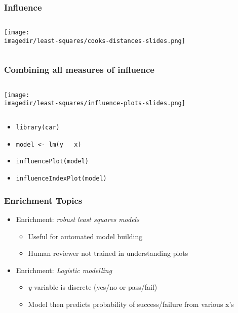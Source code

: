 \begin{frame}\frametitle{Influence}
	\begin{columns}[t]
			\begin{center}
				\texttt{[image: \\imagedir/least-squares/cooks-distances-slides.png]}
			\end{center}
	\end{columns}
\end{frame}

\begin{frame}\frametitle{Combining all measures of influence}
	\begin{columns}[t]
			\begin{center}
				\texttt{[image: \\imagedir/least-squares/influence-plots-slides.png]}
			\end{center}
	\end{columns}
	
	\begin{itemize}
		\item	\texttt{library(car)}
		\item	\texttt{model <- lm(y \string~ x)}
		\item	\texttt{influencePlot(model)}
		\item	\texttt{influenceIndexPlot(model)}
	\end{itemize}
\end{frame}

\begin{frame}\frametitle{Enrichment Topics}
	\begin{itemize}
		\item	Enrichment: \emph{ robust least squares models}
		\begin{itemize}
			\item	Useful for automated model building
			\item	Human reviewer not trained in understanding plots
		\end{itemize}
		
		\vspace{12pt}
		\item	Enrichment: \emph{Logistic modelling}
		\begin{itemize}
			\item	\emph{y}-variable is discrete (yes/no or pass/fail)
			\item	Model then predicts probability of success/failure from various x's
		\end{itemize}
	\end{itemize}
\end{frame}

